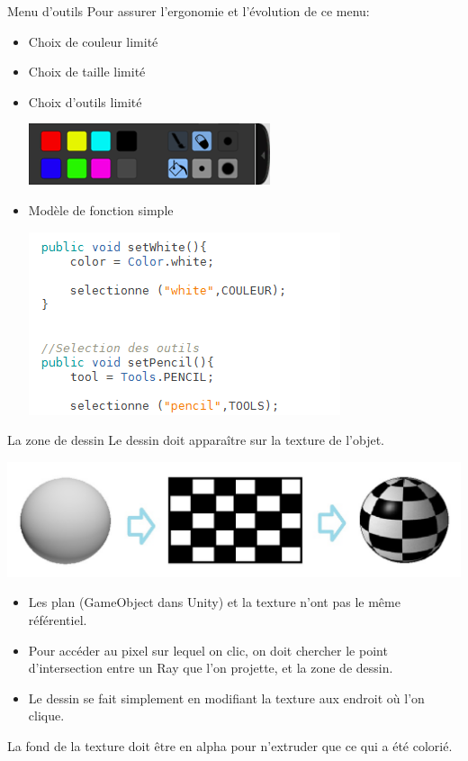 \documentclass[a4paper,10pt]{beamer}
\begin{document}
	\begin{frame}{Menu d'outils}
		Pour assurer l'ergonomie et l'évolution de ce menu:
			\begin{itemize}
				\item Choix de couleur limité
				\item Choix de taille limité
				\item Choix d'outils limité
					\centerline{\includegraphics[scale=0.4]{images/Nono/img7.png}} 
				\item Modèle de fonction simple
							\centerline{\includegraphics[scale=0.6]{images/Nono/img8.png}} 
			\end{itemize}


	\end{frame}
	
	\begin{frame}{La zone de dessin}
		Le dessin doit apparaître sur la texture de l'objet.
			\centerline{\includegraphics[scale=0.4]{images/intro/spheres.jpg}}
			
			\begin{itemize}
				\item Les plan (GameObject dans Unity) et la texture n'ont pas le même référentiel. 
				\item Pour accéder au pixel sur lequel on clic, on doit chercher le point d'intersection entre un Ray que l'on projette, et la zone de dessin.
				\item Le dessin se fait simplement en modifiant la texture aux endroit où  l'on clique.
			\end{itemize} 
		La fond de la texture doit être en alpha pour n'extruder que ce qui a été colorié.
	\end{frame}
	
\end{document}
